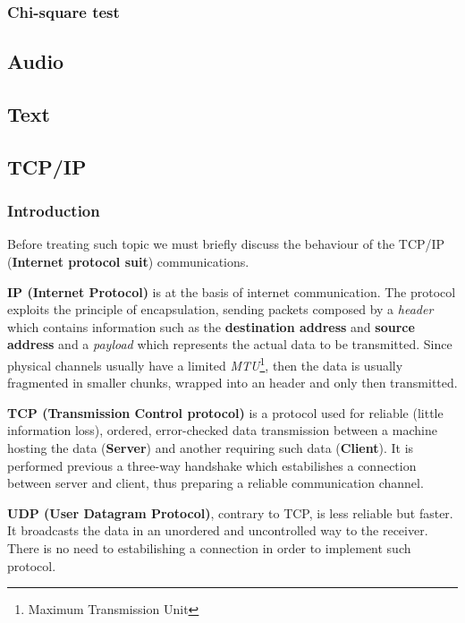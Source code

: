 \documentclass[../../main.tex]{subfiles}
\begin{document}
    \subsubsection{Chi-square test}

    

    \subsection{Audio}
    
    
    \subsection{Text}
    
    

    \subsection{TCP/IP}
    \subsubsection{Introduction}
    Before treating such topic we must briefly discuss the behaviour of the
    TCP/IP (\textbf{Internet protocol suit}) communications.
    
    \textbf{IP (Internet Protocol)} is at the basis of internet communication.
    The protocol exploits the principle of encapsulation, sending packets
    composed by a \emph{header} which contains information such as the
    \textbf{destination address} and \textbf{source address} and a
    \emph{payload} which represents the actual data to be transmitted.
    Since physical channels usually have a limited \emph{MTU}\footnote{Maximum
    Transmission Unit}, then the data is usually fragmented in smaller chunks,
    wrapped into an header and only then transmitted.
    
    \textbf{TCP (Transmission Control protocol)} is a protocol used for reliable
    (little information loss), ordered, error-checked data transmission between
    a machine hosting the data (\textbf{Server}) and another requiring such data
    (\textbf{Client}). It is performed previous a three-way handshake which
    estabilishes a connection between server and client, thus preparing a
    reliable communication channel.

    \textbf{UDP (User Datagram Protocol)}, contrary to TCP, is less reliable but
    faster.
    It broadcasts the data in an unordered and uncontrolled way to the receiver. 
    There is no need to estabilishing a connection in order to implement such
    protocol.
\end{document}
